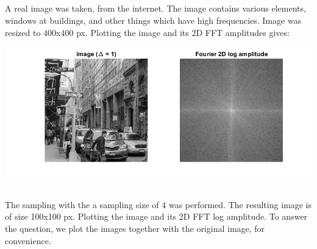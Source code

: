 \documentclass[a4paper]{iacas}
\begin{document}



\subsection{}
A real image was taken, from the internet. The image contains various elements, windows at buildings, and other things which have high frequencies. Image was resized to 400x400 px. Plotting the image and its 2D FFT amplitudes gives:

\vskip 0.1in
\begin{minipage}{1\textwidth}
\centering
	\includegraphics[scale=0.7]{../imgs/q1_5.png}
\end{minipage}
\vskip 0.1in

\subsection{}
The sampling with the a sampling size of 4 was performed. The resulting image is of size 100x100 px. Plotting the image and its 2D FFT log amplitude. To answer the question, we plot the images together with the original image, for convenience.
\end{document}
